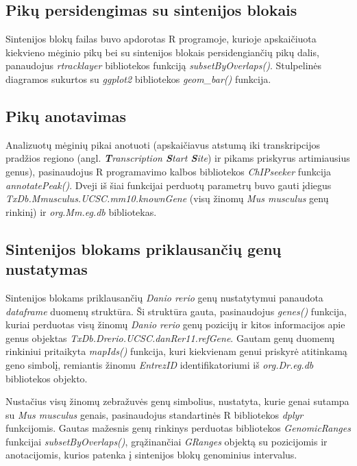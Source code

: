 \documentclass[12pt]{article}
\begin{document}
\subsection{Pikų persidengimas su sintenijos blokais}
Sintenijos blokų failas buvo apdorotas R programoje, kurioje apskaičiuota
kiekvieno mėginio pikų bei su sintenijos blokais persidengiančių pikų dalis,
panaudojus \emph{rtracklayer}\cite{R_TRACK} bibliotekos funkciją
\emph{subsetByOverlaps()}. Stulpelinės diagramos sukurtos su
\emph{ggplot2}\cite{R_GGPLOT} bibliotekos \emph{geom\_bar()} funkcija.

\subsection{Pikų anotavimas}
Analizuotų mėginių pikai anotuoti (apskaičiavus atstumą iki transkripcijos
pradžios regiono (angl. \emph{\textbf{T}ranscription \textbf{S}tart
\textbf{S}ite}) ir pikams priskyrus artimiausius genus), pasinaudojus R
programavimo kalbos bibliotekos \emph{ChIPseeker}\cite{CHIP1, CHIP2} funkcija
\emph{annotatePeak()}. Dveji iš šiai funkcijai perduotų parametrų buvo gauti
įdiegus \emph{TxDb.Mmusculus.UCSC.mm10.knownGene}\cite{KNOWN_GENE} (visų žinomų
\emph{Mus musculus} genų rinkinį) ir \emph{org.Mm.eg.db}\cite{MM_ANNOT}
bibliotekas.

\subsection{Sintenijos blokams priklausančių genų nustatymas}
Sintenijos blokams priklausančių \emph{Danio rerio} genų nustatytymui panaudota
\emph{dataframe} duomenų struktūra. Ši struktūra gauta, pasinaudojus
\emph{genes()} funkcija, kuriai perduotas visų žinomų \emph{Danio rerio} genų
pozicijų ir kitos informacijos apie genus objektas
\emph{TxDb.Drerio.UCSC.danRer11.refGene}\cite{REF_GENE}. Gautam genų duomenų
rinkiniui pritaikyta \emph{mapIds()} funkcija, kuri kiekvienam genui priskyrė
atitinkamą geno simbolį, remiantis žinomu \emph{EntrezID} identifikatoriumi iš
\emph{org.Dr.eg.db} bibliotekos objekto.

Nustačius visų žinomų zebražuvės genų simbolius, nustatyta, kurie genai sutampa
su \emph{Mus musculus} genais, pasinaudojus standartinės R bibliotekos
\emph{dplyr}\cite{DPLYR} funkcijomis. Gautas mažesnis genų rinkinys perduotas
bibliotekos \emph{GenomicRanges}\cite{GRANGES} funkcijai
\emph{subsetByOverlaps()}, grąžinančiai \emph{GRanges} objektą su pozicijomis
ir anotacijomis, kurios patenka į sintenijos blokų genominius intervalus.
\end{document}
